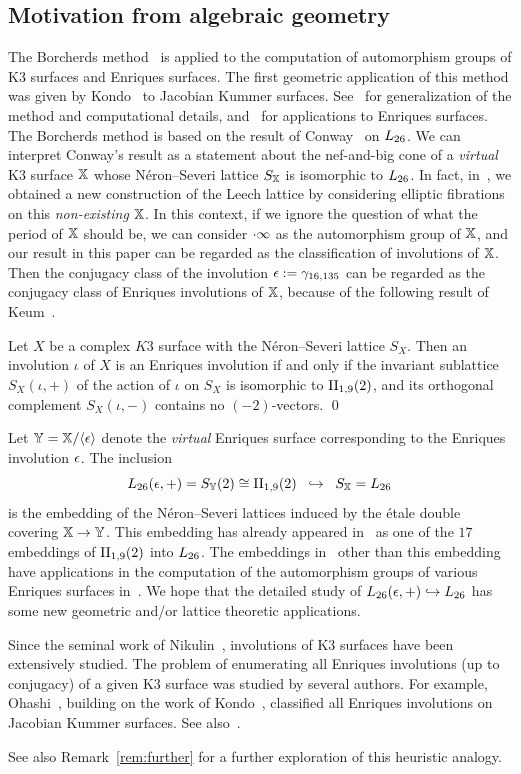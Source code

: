\documentclass{amsart} %
\begin{document}
\subsection{Motivation from algebraic geometry}\label{subsec:alggeom}
%
The Borcherds method~\cite{MR913200, MR1654763}
is applied to the computation of automorphism groups of K3 surfaces and Enriques surfaces.
The first geometric application of this method was given 
by Kondo~\cite{MR1618132} to Jacobian Kummer surfaces.
See~\cite{MR3456710, MR4759604} for generalization of the method and computational details,
and~\cite{MR4498439, MR4389670} for applications to Enriques surfaces.
The Borcherds method is based on the result of Conway~\cite{MR690711} on $L_{26}$. 
We can interpret Conway's result 
as a statement about the nef-and-big cone of a \emph{virtual} K3 surface $\mathord{\mathbb{X}}$
 whose N\'eron--Severi lattice $S_{\mathord{\mathbb{X}}}$ is isomorphic to $L_{26}$.
 In fact,
in~\cite{MR4674939}, 
we obtained a new construction of the Leech lattice
by considering elliptic fibrations on this \emph{non-existing} $\mathord{\mathbb{X}}$.
In this context, 
if we ignore  the question of what the period of $\mathord{\mathbb{X}}$ should be, 
we can consider $\cdot \infty$ as 
the automorphism group of $\mathord{\mathbb{X}}$,
and our result in this paper can be regarded as the classification of involutions of $\mathord{\mathbb{X}}$.
Then 
the conjugacy class of the involution $\epsilon:=\gamma_{16, 135}$ can be regarded 
 as the conjugacy class of Enriques involutions of $\mathord{\mathbb{X}}$,
 because of the following result of Keum~\cite{MR1060704}.
 \begin{proposition}
 Let $X$ be a complex $K3$ surface
with the N\'eron--Severi lattice $S_X$.
 Then an involution $\iota$ of $X$ is an Enriques involution
 if and only if the invariant sublattice $S_X(\iota, +)$ of 
 the action of $\iota$ on $S_X$ 
 is isomorphic to $\mathrm{II}_{1,9} (2)$,
 and its orthogonal complement $S_X(\iota, -)$
contains no $(-2)$-vectors.
 \qed
 \end{proposition}
%
Let $\mathord{\mathbb{Y}}=\mathord{\mathbb{X}}/\langle {\epsilon} \rangle$ denote the \emph{virtual} Enriques surface
corresponding to the Enriques involution $\epsilon$.
The inclusion 
\[
L_{26}(\epsilon, +)=S_{\mathord{\mathbb{Y}}}(2)\cong \mathrm{II}_{1,9} (2)\;\; \hookrightarrow \;\;S_{\mathord{\mathbb{X}}}=L_{26}
\]
is the embedding of the N\'eron--Severi lattices
induced by the \'etale double covering $\mathord{\mathbb{X}}\to \mathord{\mathbb{Y}}$.
This embedding 
has already appeared in~\cite{MR4389670} as one of the $17$ embeddings 
of $\mathrm{II}_{1,9} (2)$ into $L_{26}$.
The embeddings in~\cite{MR4389670} other than this embedding 
have applications in the computation of the automorphism groups
of various Enriques surfaces in~\cite{MR4498439}.
We hope that the detailed study of $L_{26}(\epsilon, +)\hookrightarrow L_{26}$
has some new geometric and/or lattice theoretic applications.
%
\par
Since the seminal work of Nikulin~\cite{MR633160}, 
involutions of K3 surfaces have been extensively studied.
The problem of enumerating all Enriques involutions 
(up to conjugacy) of a given K3 surface was
studied by several authors.
For example, Ohashi~\cite{MR2552959},
building on the work of Kondo~\cite{MR1618132}, 
 classified all Enriques involutions on Jacobian Kummer surfaces. 
 See also~\cite{MR4288644}.
%
\par
See also Remark~\ref{rem:further}
for a further exploration of this heuristic analogy.
%
\end{document}
